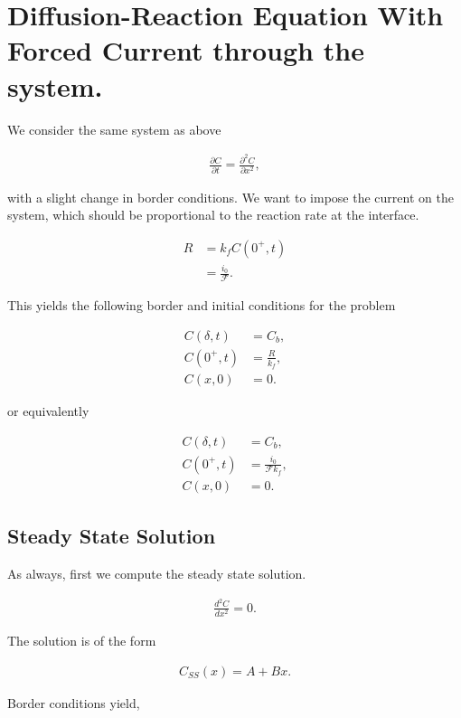 \newpage
\section{Diffusion-Reaction Equation With Forced Current through the system.}

We consider the same system as above

\begin{align}
	\frac{\partial C}{\partial t} = \frac{\partial^2 C}{\partial x^2},
\end{align}

with a slight change in border conditions. We want to impose the current on the system, which should be proportional to the reaction rate at the interface.

\begin{align}
	R &= k_f C(0^+, t)\\ 
	&= \frac{i_0}{\mathcal{F}}.
\end{align}

This yields the following border and initial conditions for the problem

\begin{align}
	C(\delta, t) &= C_b,\\
	C(0^+, t) &= \frac{R}{k_f},\\
	C(x, 0) &= 0.
\end{align}

or equivalently

\begin{align}
	C(\delta, t) &= C_b,\\
	C(0^+, t) &= \frac{i_0}{\mathcal{F}k_f},\\
	C(x, 0) &= 0.
\end{align}

\subsection{Steady State Solution}

As always, first we compute the steady state solution.

\begin{align}
	\frac{d ^2C}{d x^2} = 0.
\end{align}

The solution is of the form

\begin{align}
	C_{SS}(x) = A + Bx.
\end{align}

Border conditions yield,

